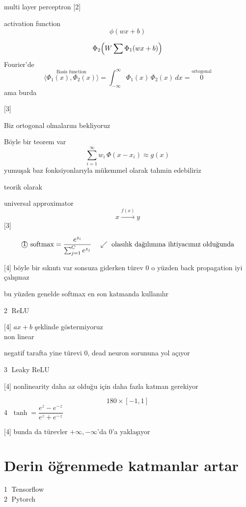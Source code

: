 \documentclass[11pt,a4paper]{article}
\begin{document}
multi layer perceptron
[2]

activation function
\[ \phi(wx+b) \]

\[ \Phi_2\Bigl(W \sum \Phi_1(wx+b)\Bigr) \]
Fourier'de
\[ \overset{\text{Basis function}}{\langle \Phi_1(x), \Phi_2(x)\rangle} = \int_{-\infty}^{\infty} \Phi_1(x)\,\Phi_2(x)\,dx = \overset{\text{ortogonal}}{0} \]
ama burda

[3]

Biz ortogonal olmalarını bekliyoruz

Böyle bir teorem var
\[ \sum_{i=1}^{\infty} w_i\,\Phi(x-x_i) \approx g(x) \]
yumuşak baz fonksiyonlarıyla mükemmel olarak tahmin edebiliriz

teorik olarak

universal approximator
\[ x \xrightarrow{f(x)} y \]
[3]

\[ \text{\textcircled{1}}\ \mathrm{softmax} = \frac{e^{z_i}}{\sum_{j=1}^{C} e^{z_j}} \quad \swarrow\ \text{olasılık dağılımına ihtiyacımız olduğunda} \]


[4]
böyle bir sıkıntı var \quad sonsuza giderken türev 0 \quad o yüzden back propagation iyi çalışmaz

bu yüzden genelde softmax en son katmanda kullanılır

\textcircled{2} ReLU

[4]
$ax+b$ şeklinde göstermiyoruz\\
non linear

negatif tarafta yine türevi 0, dead neuron sorununa yol açıyor

\textcircled{3} Leaky ReLU

[4]
nonlinearity daha az olduğu için daha fazla katman gerekiyor

\[ 180 \times [-1,1] \]
\textcircled{4} $\tanh = \dfrac{e^{z}-e^{-z}}{e^{z}+e^{-z}}$

[4]
bunda da türevler $+\infty,-\infty$'da 0'a yaklaşıyor

\section{Derin öğrenmede katmanlar artar}
\textcircled{1} Tensorflow\\
\textcircled{2} Pytorch
\end{document}
